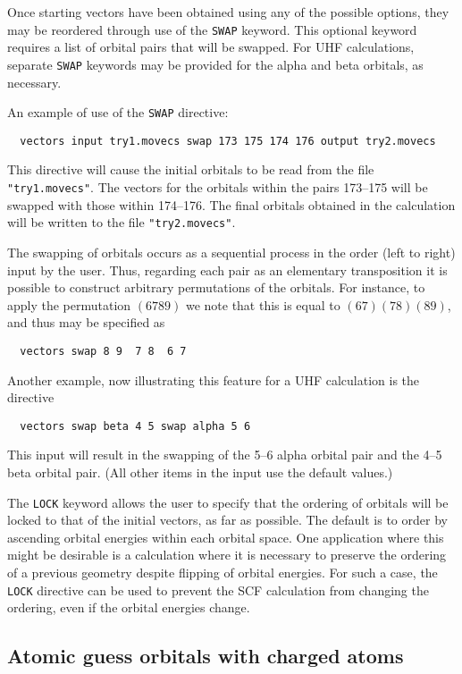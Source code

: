 Once starting vectors have been obtained using any of the possible
options, they may be reordered through use of the \verb+SWAP+ keyword.
This optional keyword requires a list of orbital pairs that will be
swapped.  For UHF calculations, separate \verb+SWAP+ keywords may be
provided for the alpha and beta orbitals, as necessary.

An example of use of the \verb+SWAP+ directive:
\begin{verbatim}
  vectors input try1.movecs swap 173 175 174 176 output try2.movecs
\end{verbatim}
This directive will cause the initial orbitals to be read from the
file \verb+"try1.movecs"+.  The vectors for the orbitals within the
pairs 173--175 will be swapped with those within 174--176.  The final
orbitals obtained in the calculation will be written to the file
\verb+"try2.movecs"+.

The swapping of orbitals occurs as a sequential process in the order
(left to right) input by the user.  Thus, regarding each pair as an
elementary transposition it is possible to construct arbitrary
permutations of the orbitals.  For instance, to apply the permutation
$(6 7 8 9)$ we note that this is equal to $(6 7)(7 8)(8 9)$, and thus
may be specified as
\begin{verbatim}
  vectors swap 8 9  7 8  6 7
\end{verbatim}

Another example, now illustrating this feature for a UHF calculation
is the directive
\begin{verbatim}
  vectors swap beta 4 5 swap alpha 5 6
\end{verbatim}
This input will result in the swapping of the 5--6 alpha orbital pair and 
the 4--5 beta orbital pair.  (All other items in the input use the
default values.)

The \verb+LOCK+ keyword allows the user to specify that the ordering
of orbitals will be locked to that of the initial vectors, as far as
possible. The default is to order by ascending orbital energies within
each orbital space. One application where this might be desirable is a
calculation where it is necessary to preserve the ordering of a
previous geometry despite flipping of orbital energies.  For such a
case, the \verb+LOCK+ directive can be used to prevent the SCF
calculation from changing the ordering, even if the orbital energies
change.

\subsection{Atomic guess orbitals with charged atoms}

